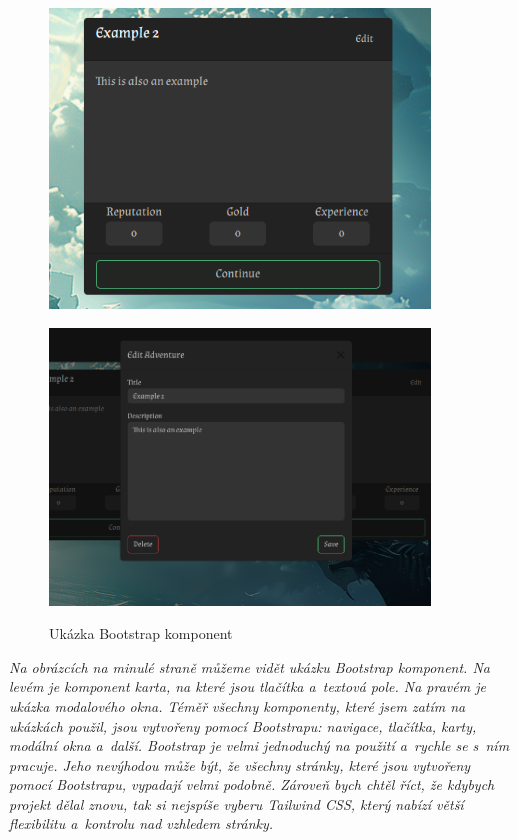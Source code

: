 \begin{figure}[H]
  \centering
  \begin{minipage}{0.4\textwidth}
    \centering
    \includegraphics[width=0.9\textwidth]{resources/figures/example9.png}
    \label{fig:example9}
  \end{minipage}
  \begin{minipage}{0.5\textwidth}
    \centering
    \includegraphics[width=0.9\textwidth]{resources/figures/example10.png}
    \label{fig:example10}
  \end{minipage}
  \caption{Ukázka Bootstrap komponent}
\end{figure}

\textit{Na obrázcích na minulé straně můžeme vidět ukázku Bootstrap komponent. Na levém je komponent karta, na které jsou tlačítka a~textová pole. Na pravém je ukázka modalového okna. Téměř všechny komponenty, které jsem zatím na ukázkách použil, jsou vytvořeny pomocí Bootstrapu: navigace, tlačítka, karty, modální okna a~další. Bootstrap je velmi jednoduchý na použití a~rychle se s~ním pracuje. Jeho nevýhodou může být, že všechny stránky, které jsou vytvořeny pomocí Bootstrapu, vypadají velmi podobně. Zároveň bych chtěl říct, že kdybych projekt dělal znovu, tak si nejspíše vyberu Tailwind CSS, který nabízí větší flexibilitu a~kontrolu nad vzhledem stránky.}

